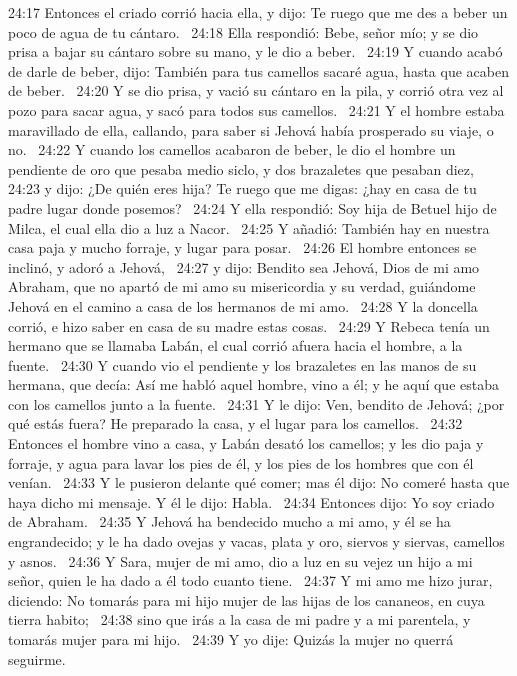 24:17 Entonces el criado corrió hacia ella, y dijo: Te ruego que me des a beber un poco de agua de tu cántaro.  
24:18 Ella respondió: Bebe, señor mío; y se dio prisa a bajar su cántaro sobre su mano, y le dio a beber.  
24:19 Y cuando acabó de darle de beber, dijo: También para tus camellos sacaré agua, hasta que acaben de beber.  
24:20 Y se dio prisa, y vació su cántaro en la pila, y corrió otra vez al pozo para sacar agua, y sacó para todos sus camellos.  
24:21 Y el hombre estaba maravillado de ella, callando, para saber si Jehová había prosperado su viaje, o no.  
24:22 Y cuando los camellos acabaron de beber, le dio el hombre un pendiente de oro que pesaba medio siclo, y dos brazaletes que pesaban diez,  
24:23 y dijo: ¿De quién eres hija? Te ruego que me digas: ¿hay en casa de tu padre lugar donde posemos?  
24:24 Y ella respondió: Soy hija de Betuel hijo de Milca, el cual ella dio a luz a Nacor.  
24:25 Y añadió: También hay en nuestra casa paja y mucho forraje, y lugar para posar.  
24:26 El hombre entonces se inclinó, y adoró a Jehová,  
24:27 y dijo: Bendito sea Jehová, Dios de mi amo Abraham, que no apartó de mi amo su misericordia y su verdad, guiándome Jehová en el camino a casa de los hermanos de mi amo.  
24:28 Y la doncella corrió, e hizo saber en casa de su madre estas cosas.  
24:29 Y Rebeca tenía un hermano que se llamaba Labán, el cual corrió afuera hacia el hombre, a la fuente.  
24:30 Y cuando vio el pendiente y los brazaletes en las manos de su hermana, que decía: Así me habló aquel hombre, vino a él; y he aquí que estaba con los camellos junto a la fuente.  
24:31 Y le dijo: Ven, bendito de Jehová; ¿por qué estás fuera? He preparado la casa, y el lugar para los camellos.  
24:32 Entonces el hombre vino a casa, y Labán desató los camellos; y les dio paja y forraje, y agua para lavar los pies de él, y los pies de los hombres que con él venían.  
24:33 Y le pusieron delante qué comer; mas él dijo: No comeré hasta que haya dicho mi mensaje. Y él le dijo: Habla.  
24:34 Entonces dijo: Yo soy criado de Abraham.  
24:35 Y Jehová ha bendecido mucho a mi amo, y él se ha engrandecido; y le ha dado ovejas y vacas, plata y oro, siervos y siervas, camellos y asnos.  
24:36 Y Sara, mujer de mi amo, dio a luz en su vejez un hijo a mi señor, quien le ha dado a él todo cuanto tiene.  
24:37 Y mi amo me hizo jurar, diciendo: No tomarás para mi hijo mujer de las hijas de los cananeos, en cuya tierra habito;  
24:38 sino que irás a la casa de mi padre y a mi parentela, y tomarás mujer para mi hijo.  
24:39 Y yo dije: Quizás la mujer no querrá seguirme.  
